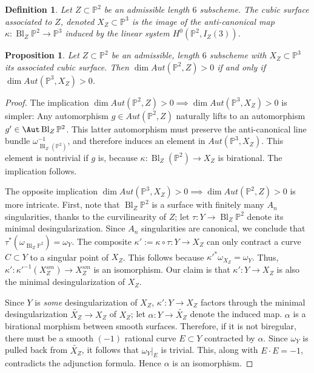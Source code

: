 \documentclass[12 pt]{amsart}
\newtheorem{proposition}{Proposition}[section]
\newtheorem{definition}{Definition}[section]
\renewcommand{\P}{\mathbb{P}}
\newcommand{\<}{\left\langle}
\renewcommand{\>}{\right\rangle}
\DeclareMathOperator{\Bl}{Bl}
\begin{document}
\begin{definition}
  \label{def:cubicZ} Let $Z \subset \P^2$ be an admissible length $6$
  subscheme.  The {\sl cubic surface associated to $Z$}, denoted
  $X_Z \subset \P^3$ is the image of the anti-canonical map
  $\kappa: \Bl_{Z}\P^2 \to \P^3$ induced by the linear system
  $H^0(\P^2,I_Z(3))$.
\end{definition}

\begin{proposition}
  \label{prop:good} Let $Z \subset \P^2$ be an admissible, length $6$
  subscheme with $X_Z \subset \P^3$ its associated cubic surface. Then
  $\dim Aut(\P^2,Z) > 0$ if and only if $\dim Aut(\P^3,X_Z) > 0$.
\end{proposition}

\begin{proof} The implication
  $\dim Aut(\P^2,Z) > 0 \implies \dim Aut(\P^3,X_Z) > 0$ is simpler:
  Any automorphism $g \in Aut(\P^2,Z)$ naturally lifts to an
  automorphism $g' \in \Aut \Bl_{Z}\P^2$. This latter automorphism
  must preserve the anti-canonical line bundle
  $\omega_{\Bl_{Z}(\P^2)}^{-1}$, and therefore induces an element in
  $Aut(\P^3, X_Z)$. This element is nontrivial if $g$ is, because
  $\kappa: \Bl_{Z}(\P^2) \to X_Z$ is birational. The implication
  follows.


  The opposite implication
  $\dim Aut(\P^3,X_Z) > 0 \implies \dim Aut(\P^2,Z) > 0$ is more
  intricate. First, note that $\Bl_{Z}\P^2$ is a surface with finitely
  many $A_n$ singularities, thanks to the curvilinearity of $Z$; let
  $\tau: Y \to \Bl_{Z}\P^2$ denote its minimal desingularization.
  Since $A_n$ singularities are canonical, we conclude that
  $\tau^{*}(\omega_{\Bl_{Z}\P^2}) = \omega_{Y}$.  The composite
  $\kappa':= \kappa \circ \tau: Y \to X_{Z}$ can only contract a curve
  $C \subset Y$ to a singular point of $X_Z$.  This follows because   
  $\kappa'^{*}\omega_{X_{Z}} = \omega_{Y}$. Thus,
  $\kappa': \kappa'^{-1}(X_{Z}^{sm}) \to X_{Z}^{sm}$ is an
  isomorphism. Our claim is that $\kappa':Y \to X_{Z}$ is also the
  minimal desingularization of $X_Z$.

  Since $Y$ is {\sl some} desingularization of $X_Z$,
  $\kappa':Y \to X_{Z}$ factors through the minimal desingularization
  $\widetilde{X_{Z}} \to X_{Z}$ of $X_{Z}$; let
  $\alpha: Y \to \widetilde{X_{Z}}$ denote the induced map. $\alpha$
  is a birational morphism between smooth surfaces. Therefore, if it
  is not biregular, there must be a smooth $(-1)$ rational curve
  $E \subset Y$ contracted by $\alpha$.  Since $\omega_{Y}$ is pulled
  back from $\widetilde{X_{Z}}$, it follows that $\omega_{Y}|_{E}$ is
  trivial. This, along with $E \cdot E = -1$, contradicts the
  adjunction formula.  Hence $\alpha$ is an isomorphism.


\end{proof}
\end{document}
